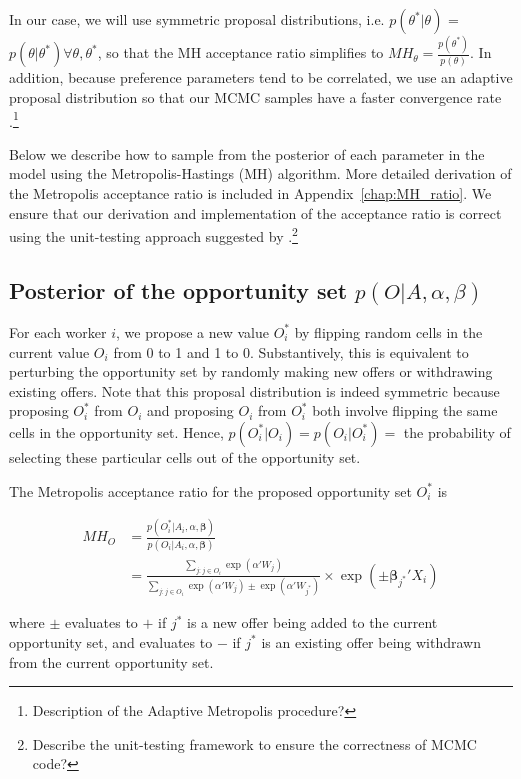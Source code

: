 In our case, we will use symmetric proposal distributions, i.e.
$p(\theta^*|\theta)$ = $p(\theta | \theta^*) \forall \theta, \theta^*$, so that
the MH acceptance ratio simplifies to $MH_{\theta} =
\frac{p(\theta^*)}{p(\theta)}$. In addition, because preference parameters tend
to be correlated, we use an adaptive proposal distribution so that our MCMC
samples have a faster convergence rate \citep{Haario1999,
  Haario2001}.\footnote{Description of the Adaptive Metropolis procedure?}

Below we describe how to sample from the posterior of each parameter in the
model using the Metropolis-Hastings (MH) algorithm. More detailed derivation of
the Metropolis acceptance ratio is included in Appendix~\ref{chap:MH_ratio}. We
ensure that our derivation and implementation of the acceptance ratio is correct
using the unit-testing approach suggested by
\citet{Grosse2014}.\footnote{Describe the unit-testing framework to ensure the
  correctness of MCMC code?}

\subsection{Posterior of the opportunity set $p(O|A, \alpha, \beta)$}

For each worker $i$, we propose a new value $O_i^*$ by flipping random cells in
the current value $O_i$ from 0 to 1 and 1 to 0. Substantively, this is
equivalent to perturbing the opportunity set by randomly making new offers or
withdrawing existing offers. Note that this proposal distribution is indeed
symmetric because proposing $O_i^*$ from $O_i$ and proposing $O_i$ from $O_i^*$
both involve flipping the same cells in the opportunity set. Hence,
$p(O_i^*|O_i) = p(O_i|O_i^*) =$ the probability of selecting these particular
cells out of the opportunity set.

The Metropolis acceptance ratio for the proposed opportunity set $O_i^*$ is

\begin{align}
  MH_O &= \frac{p(O_i^* | A_i, \alpha, \bm{\beta})}{p(O_i | A_i, \alpha, \bm{\beta})} \\
       &= \frac{\sum\limits_{j:j \in O_i} \exp(\alpha'W_j)}{\sum\limits_{j:j \in O_i} \exp(\alpha'W_j) \pm \exp(\alpha' W_{j^*})} \times \exp(\pm \bm{\beta}_{j^*}'X_i)
\end{align}

where $\pm$ evaluates to $+$ if $j^*$ is a new offer being added to the current
opportunity set, and evaluates to $-$ if $j^*$ is an existing offer being
withdrawn from the current opportunity set.

